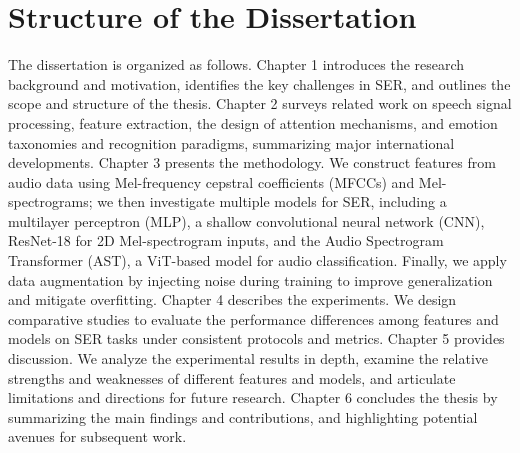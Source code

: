 \section{Structure of the Dissertation}
The dissertation is organized as follows.
Chapter 1 introduces the research background and motivation, identifies the key challenges in SER, and outlines the scope and structure of the thesis.
Chapter 2 surveys related work on speech signal processing, feature extraction, the design of attention mechanisms, and emotion taxonomies and recognition paradigms, summarizing major international developments.
Chapter 3 presents the methodology. We construct features from audio data using Mel-frequency cepstral coefficients (MFCCs) and Mel-spectrograms; we then investigate multiple models for SER, including a multilayer perceptron (MLP), a shallow convolutional neural network (CNN), ResNet-18 for 2D Mel-spectrogram inputs, and the Audio Spectrogram Transformer (AST), a ViT-based model for audio classification. Finally, we apply data augmentation by injecting noise during training to improve generalization and mitigate overfitting.
Chapter 4 describes the experiments. We design comparative studies to evaluate the performance differences among features and models on SER tasks under consistent protocols and metrics.
Chapter 5 provides discussion. We analyze the experimental results in depth, examine the relative strengths and weaknesses of different features and models, and articulate limitations and directions for future research.
Chapter 6 concludes the thesis by summarizing the main findings and contributions, and highlighting potential avenues for subsequent work.

